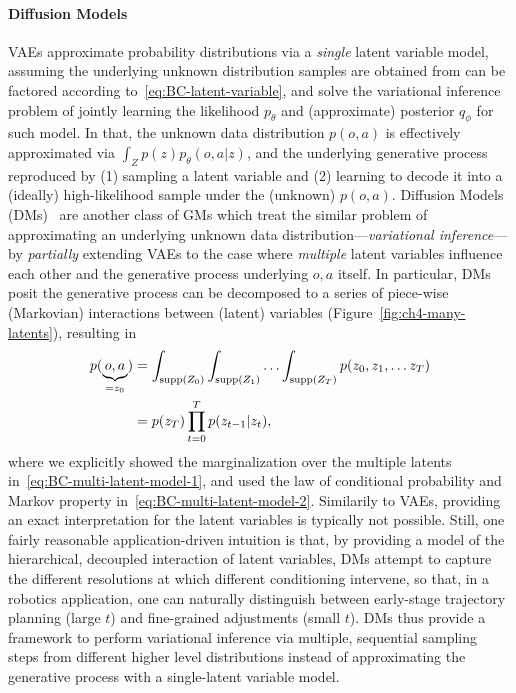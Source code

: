 \paragraph{Diffusion Models}
VAEs approximate probability distributions via a \emph{single} latent variable model, assuming the underlying unknown distribution samples are obtained from can be factored according to~\ref{eq:BC-latent-variable}, and solve the variational inference problem of jointly learning the likelihood \( p_\theta \) and (approximate) posterior \( q_\phi \) for such model.
In that, the unknown data distribution \( p(o,a) \) is effectively approximated via \( \int_Z p(z) p_\theta(o,a \vert z) \), and the underlying generative process reproduced by (1) sampling a latent variable and (2) learning to decode it into a (ideally) high-likelihood sample under the (unknown) \( p(o,a) \).
Diffusion Models (DMs)~\citep{hoDenoisingDiffusionProbabilistic2020} are another class of GMs which treat the similar problem of approximating an underlying unknown data distribution---\emph{variational inference}---by \emph{partially} extending VAEs to the case where \emph{multiple} latent variables influence each other and the generative process underlying \(o,a\) itself.
In particular, DMs posit the generative process can be decomposed to a series of piece-wise (Markovian) interactions between (latent) variables (Figure~\ref{fig:ch4-many-latents}), resulting in
\begin{align}
    p(\underbrace{o,a}_{= z_0}) &= \int_{\text{supp}({Z_0})} \int_{\text{supp}({Z_1})} \hdots \int_{\text{supp}({Z_T})} p(z_0, z_1, \dots z_T) \label{eq:BC-multi-latent-model-1} \\ 
    &= p(z_T) \prod_{t=0}^{T} p(z_{t-1} \vert z_t), \label{eq:BC-multi-latent-model-2}
\end{align}
where we explicitly showed the marginalization over the multiple latents in~\ref{eq:BC-multi-latent-model-1}, and used the law of conditional probability and Markov property in~\ref{eq:BC-multi-latent-model-2}.
Similarily to VAEs, providing an exact interpretation for the latent variables is typically not possible.
Still, one fairly reasonable application-driven intuition is that, by providing a model of the hierarchical, decoupled interaction of latent variables, DMs attempt to capture the different resolutions at which different conditioning intervene, so that, in a robotics application, one can naturally distinguish between early-stage trajectory planning (large \( t \)) and fine-grained adjustments (small \( t \)).
DMs thus provide a framework to perform variational inference via multiple, sequential sampling steps from different higher level distributions instead of approximating the generative process with a single-latent variable model.

